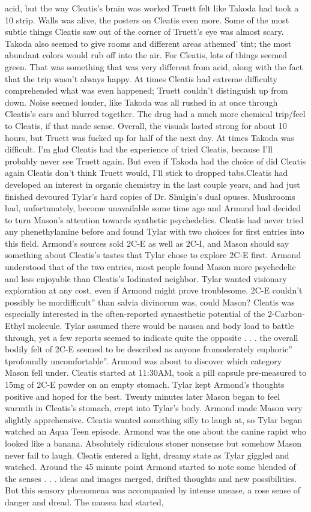 \documentclass[12pt]{book}
\begin{document}
acid, but the way Cleatis's brain was worked Truett felt like Takoda had took a 10 strip. Walls was alive, the posters on Cleatis even more. Some of the most subtle things Cleatis saw out of the corner of Truett's eye was almost scary. Takoda also seemed to give rooms and different areas athemed' tint; the most abundant colors would rub off into the air. For Cleatis, lots of things seemed green. That was something that was very different from acid, along with the fact that the trip wasn't always happy. At times Cleatis had extreme difficulty comprehended what was even happened; Truett couldn't distinguish up from down. Noise seemed louder, like Takoda was all rushed in at once through Cleatis's ears and blurred together. The drug had a much more chemical trip/feel to Cleatis, if that made sense. Overall, the visuals lasted strong for about 10 hours, but Truett was fucked up for half of the next day. At times Takoda was difficult. I'm glad Cleatis had the experience of tried Cleatis, because I'll probably never see Truett again. But even if Takoda had the choice of did Cleatis again Cleatis don't think Truett would, I'll stick to dropped tabs.Cleatis had developed an interest in organic chemistry in the last couple years, and had just finished devoured Tylar's hard copies of Dr. Shulgin's dual opuses. Mushrooms had, unfortunately, become unavailable some time ago and Armond had decided to turn Mason's attention towards synthetic psychedelics. Cleatis had never tried any phenethylamine before and found Tylar with two choices for first entries into this field. Armond's sources sold 2C-E as well as 2C-I, and Mason should say something about Cleatis's tastes that Tylar chose to explore 2C-E first. Armond understood that of the two entries, most people found Mason more psychedelic and less enjoyable than Cleatis's Iodinated neighbor. Tylar wanted visionary exploration at any cost, even if Armond might prove troublesome. 2C-E couldn't possibly be mordifficult'' than salvia divinorum was, could Mason? Cleatis was especially interested in the often-reported synaesthetic potential of the 2-Carbon-Ethyl molecule. Tylar assumed there would be nausea and body load to battle through, yet a few reports seemed to indicate quite the opposite . . .  the overall bodily felt of 2C-E seemed to be described as anyone fromoderately euphoric'' tprofoundly uncomfortable''. Armond was about to discover which category Mason fell under. Cleatis started at 11:30AM, took a pill capsule pre-measured to 15mg of 2C-E powder on an empty stomach. Tylar kept Armond's thoughts positive and hoped for the best. Twenty minutes later Mason began to feel warmth in Cleatis's stomach, crept into Tylar's body. Armond made Mason very slightly apprehensive. Cleatis wanted something silly to laugh at, so Tylar began watched an Aqua Teen episode. Armond was the one about the canine rapist who looked like a banana. Absolutely ridiculous stoner nonsense but somehow Mason never fail to laugh. Cleatis entered a light, dreamy state as Tylar giggled and watched. Around the 45 minute point Armond started to note some blended of the senses . . .  ideas and images merged, drifted thoughts and new possibilities. But this sensory phenomena was accompanied by intense unease, a rose sense of danger and dread. The nausea had started, 
\end{document}
